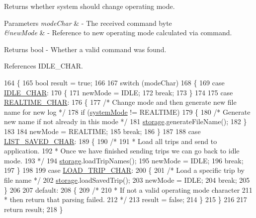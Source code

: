 Returns whether system should change operating mode. 


\begin{DoxyParams}{Parameters}
{\em mode\+Char} & -\/ The received command byte \\
\hline
{\em \&new\+Mode} & -\/ Reference to new operating mode calculated via command. \\
\hline
\end{DoxyParams}
\begin{DoxyReturn}{Returns}
bool -\/ Whether a valid command was found. 
\end{DoxyReturn}


References I\+D\+L\+E\+\_\+\+C\+H\+AR.


\begin{DoxyCode}
164 \{
165   \textcolor{keywordtype}{bool} result = \textcolor{keyword}{true};
166 
167   \textcolor{keywordflow}{switch} (modeChar)
168   \{
169     \textcolor{keywordflow}{case} \hyperlink{logging-device_8ino_ad7f0721d7856c100a69be7fa82e2865b}{IDLE\_CHAR}:
170     \{
171       newMode = IDLE;
172       \textcolor{keywordflow}{break};
173     \}
174 
175     \textcolor{keywordflow}{case} \hyperlink{logging-device_8ino_a911a5839eebf5e3d5927f4f77e9bfb62}{REALTIME\_CHAR}:
176     \{
177       \textcolor{comment}{/* Change mode and then generate new file name for new log */}
178       \textcolor{keywordflow}{if} (\hyperlink{logging-device_8ino_a13a2ecbcf455940dd240e54e9e39cf7a}{systemMode} != REALTIME)
179       \{
180         \textcolor{comment}{/* Generate new name if not already in this mode */}
181         \hyperlink{logging-device_8ino_a40059244119c00baa1b841119cfd1b2e}{storage}.generateFileName();
182       \}
183 
184       newMode = REALTIME;
185       \textcolor{keywordflow}{break};
186     \}
187 
188     \textcolor{keywordflow}{case} \hyperlink{logging-device_8ino_a4ffb22b7b0017657087830d24f68a323}{LIST\_SAVED\_CHAR}:
189     \{
190       \textcolor{comment}{/*}
191 \textcolor{comment}{       * Load all trips and send to application.}
192 \textcolor{comment}{       * Once we have finished sending trips we can go back to idle mode.}
193 \textcolor{comment}{       */}
194       \hyperlink{logging-device_8ino_a40059244119c00baa1b841119cfd1b2e}{storage}.loadTripNames();
195       newMode = IDLE;
196       \textcolor{keywordflow}{break};
197     \}
198 
199     \textcolor{keywordflow}{case} \hyperlink{logging-device_8ino_aa72e33a6bcfedf9118f573741b4e137b}{LOAD\_TRIP\_CHAR}:
200     \{
201       \textcolor{comment}{/* Load a specific trip by file name */}
202       \hyperlink{logging-device_8ino_a40059244119c00baa1b841119cfd1b2e}{storage}.loadSavedTrip();
203       newMode = IDLE;
204       \textcolor{keywordflow}{break};
205     \}
206 
207     \textcolor{keywordflow}{default}:
208     \{
209       \textcolor{comment}{/*}
210 \textcolor{comment}{       * If not a valid operating mode character}
211 \textcolor{comment}{       * then return that parsing failed.}
212 \textcolor{comment}{       */}
213       result = \textcolor{keyword}{false};
214     \}
215   \}
216 
217   \textcolor{keywordflow}{return} result;
218 \}
\end{DoxyCode}
